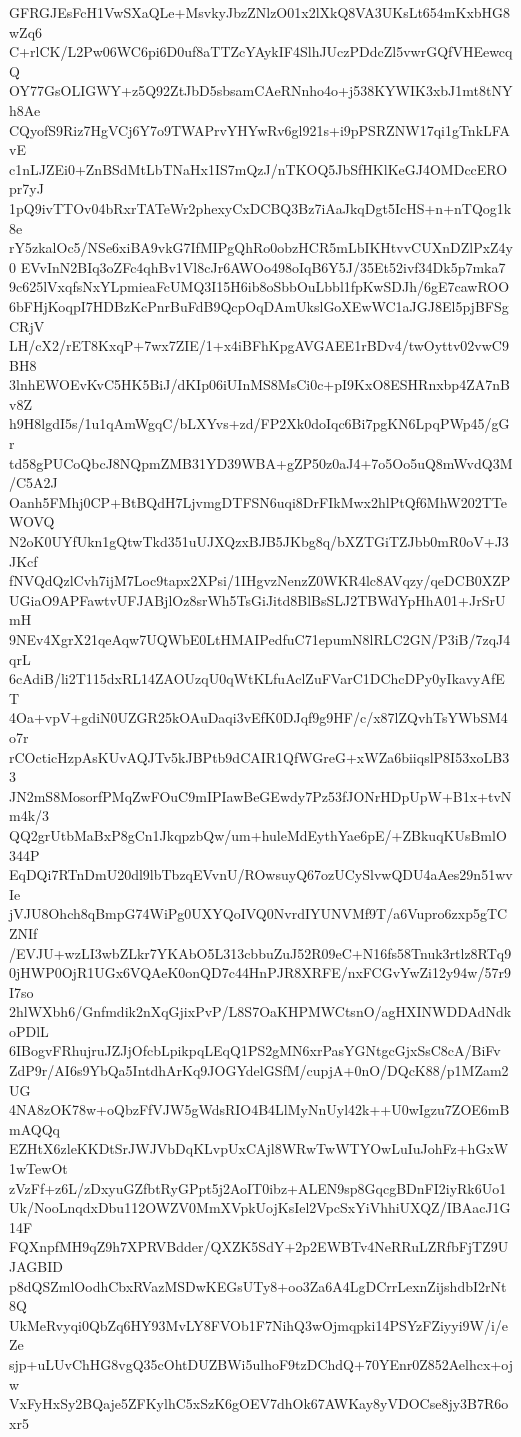 GFRGJEsFcH1VwSXaQLe+MsvkyJbzZNlzO01x2lXkQ8VA3UKsLt654mKxbHG8wZq6
C+rlCK/L2Pw06WC6pi6D0uf8aTTZcYAykIF4SlhJUczPDdcZl5vwrGQfVHEewcqQ
OY77GsOLIGWY+z5Q92ZtJbD5sbsamCAeRNnho4o+j538KYWIK3xbJ1mt8tNYh8Ae
CQyofS9Riz7HgVCj6Y7o9TWAPrvYHYwRv6gl921s+i9pPSRZNW17qi1gTnkLFAvE
c1nLJZEi0+ZnBSdMtLbTNaHx1IS7mQzJ/nTKOQ5JbSfHKlKeGJ4OMDccEROpr7yJ
1pQ9ivTTOv04bRxrTATeWr2phexyCxDCBQ3Bz7iAaJkqDgt5IcHS+n+nTQog1k8e
rY5zkalOc5/NSe6xiBA9vkG7IfMIPgQhRo0obzHCR5mLbIKHtvvCUXnDZlPxZ4y0
EVvInN2BIq3oZFc4qhBv1Vl8cJr6AWOo498oIqB6Y5J/35Et52ivf34Dk5p7mka7
9c625lVxqfsNxYLpmieaFcUMQ3I15H6ib8oSbbOuLbbl1fpKwSDJh/6gE7cawROO
6bFHjKoqpI7HDBzKcPnrBuFdB9QcpOqDAmUkslGoXEwWC1aJGJ8El5pjBFSgCRjV
LH/cX2/rET8KxqP+7wx7ZIE/1+x4iBFhKpgAVGAEE1rBDv4/twOyttv02vwC9BH8
3lnhEWOEvKvC5HK5BiJ/dKIp06iUInMS8MsCi0c+pI9KxO8ESHRnxbp4ZA7nBv8Z
h9H8lgdI5s/1u1qAmWgqC/bLXYvs+zd/FP2Xk0doIqc6Bi7pgKN6LpqPWp45/gGr
td58gPUCoQbcJ8NQpmZMB31YD39WBA+gZP50z0aJ4+7o5Oo5uQ8mWvdQ3M/C5A2J
Oanh5FMhj0CP+BtBQdH7LjvmgDTFSN6uqi8DrFIkMwx2hlPtQf6MhW202TTeWOVQ
N2oK0UYfUkn1gQtwTkd351uUJXQzxBJB5JKbg8q/bXZTGiTZJbb0mR0oV+J3JKcf
fNVQdQzlCvh7ijM7Loc9tapx2XPsi/1IHgvzNenzZ0WKR4lc8AVqzy/qeDCB0XZP
UGiaO9APFawtvUFJABjlOz8srWh5TsGiJitd8BlBsSLJ2TBWdYpHhA01+JrSrUmH
9NEv4XgrX21qeAqw7UQWbE0LtHMAIPedfuC71epumN8lRLC2GN/P3iB/7zqJ4qrL
6cAdiB/li2T115dxRL14ZAOUzqU0qWtKLfuAclZuFVarC1DChcDPy0yIkavyAfET
4Oa+vpV+gdiN0UZGR25kOAuDaqi3vEfK0DJqf9g9HF/c/x87lZQvhTsYWbSM4o7r
rCOcticHzpAsKUvAQJTv5kJBPtb9dCAIR1QfWGreG+xWZa6biiqslP8I53xoLB33
JN2mS8MosorfPMqZwFOuC9mIPIawBeGEwdy7Pz53fJONrHDpUpW+B1x+tvNm4k/3
QQ2grUtbMaBxP8gCn1JkqpzbQw/um+huleMdEythYae6pE/+ZBkuqKUsBmlO344P
EqDQi7RTnDmU20dl9lbTbzqEVvnU/ROwsuyQ67ozUCySlvwQDU4aAes29n51wvIe
jVJU8Ohch8qBmpG74WiPg0UXYQoIVQ0NvrdIYUNVMf9T/a6Vupro6zxp5gTCZNIf
/EVJU+wzLI3wbZLkr7YKAbO5L313cbbuZuJ52R09eC+N16fs58Tnuk3rtlz8RTq9
0jHWP0OjR1UGx6VQAeK0onQD7c44HnPJR8XRFE/nxFCGvYwZi12y94w/57r9I7so
2hlWXbh6/Gnfmdik2nXqGjixPvP/L8S7OaKHPMWCtsnO/agHXINWDDAdNdkoPDlL
6IBogvFRhujruJZJjOfcbLpikpqLEqQ1PS2gMN6xrPasYGNtgcGjxSsC8cA/BiFv
ZdP9r/AI6s9YbQa5IntdhArKq9JOGYdelGSfM/cupjA+0nO/DQcK88/p1MZam2UG
4NA8zOK78w+oQbzFfVJW5gWdsRIO4B4LlMyNnUyl42k++U0wIgzu7ZOE6mBmAQQq
EZHtX6zleKKDtSrJWJVbDqKLvpUxCAjl8WRwTwWTYOwLuIuJohFz+hGxW1wTewOt
zVzFf+z6L/zDxyuGZfbtRyGPpt5j2AoIT0ibz+ALEN9sp8GqcgBDnFI2iyRk6Uo1
Uk/NooLnqdxDbu112OWZV0MmXVpkUojKsIel2VpcSxYiVhhiUXQZ/IBAacJ1G14F
FQXnpfMH9qZ9h7XPRVBdder/QXZK5SdY+2p2EWBTv4NeRRuLZRfbFjTZ9UJAGBID
p8dQSZmlOodhCbxRVazMSDwKEGsUTy8+oo3Za6A4LgDCrrLexnZijshdbI2rNt8Q
UkMeRvyqi0QbZq6HY93MvLY8FVOb1F7NihQ3wOjmqpki14PSYzFZiyyi9W/i/eZe
sjp+uLUvChHG8vgQ35cOhtDUZBWi5ulhoF9tzDChdQ+70YEnr0Z852Aelhcx+ojw
VxFyHxSy2BQaje5ZFKylhC5xSzK6gOEV7dhOk67AWKay8yVDOCse8jy3B7R6oxr5
